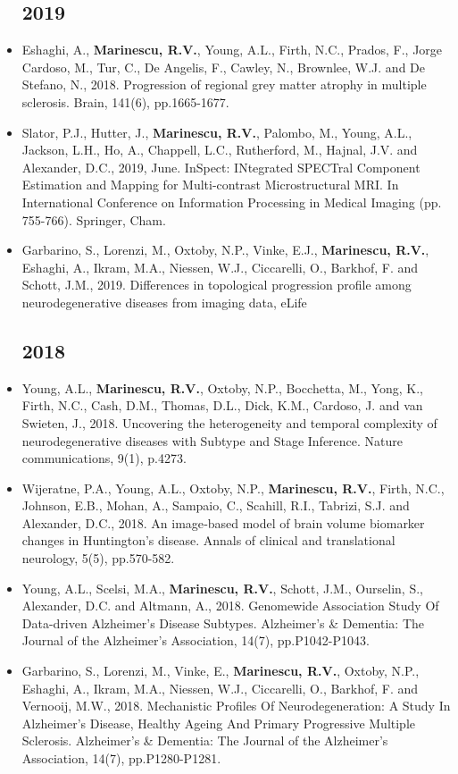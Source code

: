 \documentclass[a4paper,10pt]{article} %
\begin{document}
\begin{itemize}
\subsection*{2019}
\item[\journal] Eshaghi, A., \textbf{Marinescu, R.V.}, Young, A.L., Firth, N.C., Prados, F., Jorge Cardoso, M., Tur, C., De Angelis, F., Cawley, N., Brownlee, W.J. and De Stefano, N., 2018. Progression of regional grey matter atrophy in multiple sclerosis. Brain, 141(6), pp.1665-1677.
\item[\poster] Slator, P.J., Hutter, J., \textbf{Marinescu, R.V.}, Palombo, M., Young, A.L., Jackson, L.H., Ho, A., Chappell, L.C., Rutherford, M., Hajnal, J.V. and Alexander, D.C., 2019, June. InSpect: INtegrated SPECTral Component Estimation and Mapping for Multi-contrast Microstructural MRI. In International Conference on Information Processing in Medical Imaging (pp. 755-766). Springer, Cham.
\item[\journal] Garbarino, S., Lorenzi, M., Oxtoby, N.P., Vinke, E.J., \textbf{Marinescu, R.V.}, Eshaghi, A., Ikram, M.A., Niessen, W.J., Ciccarelli, O., Barkhof, F. and Schott, J.M., 2019. Differences in topological progression profile among neurodegenerative diseases from imaging data, eLife
\subsection*{2018}
\item[\journal] Young, A.L., \textbf{Marinescu, R.V.}, Oxtoby, N.P., Bocchetta, M., Yong, K., Firth, N.C., Cash, D.M., Thomas, D.L., Dick, K.M., Cardoso, J. and van Swieten, J., 2018. Uncovering the heterogeneity and temporal complexity of neurodegenerative diseases with Subtype and Stage Inference. Nature communications, 9(1), p.4273.
\item[\journal] Wijeratne, P.A., Young, A.L., Oxtoby, N.P., \textbf{Marinescu, R.V.}, Firth, N.C., Johnson, E.B., Mohan, A., Sampaio, C., Scahill, R.I., Tabrizi, S.J. and Alexander, D.C., 2018. An image‐based model of brain volume biomarker changes in Huntington's disease. Annals of clinical and translational neurology, 5(5), pp.570-582.
\item[\poster] Young, A.L., Scelsi, M.A., \textbf{Marinescu, R.V.}, Schott, J.M., Ourselin, S., Alexander, D.C. and Altmann, A., 2018. Genomewide Association Study Of Data-driven Alzheimer's Disease Subtypes. Alzheimer's \& Dementia: The Journal of the Alzheimer's Association, 14(7), pp.P1042-P1043.
\item[\poster] Garbarino, S., Lorenzi, M., Vinke, E., \textbf{Marinescu, R.V.}, Oxtoby, N.P., Eshaghi, A., Ikram, M.A., Niessen, W.J., Ciccarelli, O., Barkhof, F. and Vernooij, M.W., 2018. Mechanistic Profiles Of Neurodegeneration: A Study In Alzheimer’s Disease, Healthy Ageing And Primary Progressive Multiple Sclerosis. Alzheimer's \& Dementia: The Journal of the Alzheimer's Association, 14(7), pp.P1280-P1281.


\end{itemize}
\end{document}
